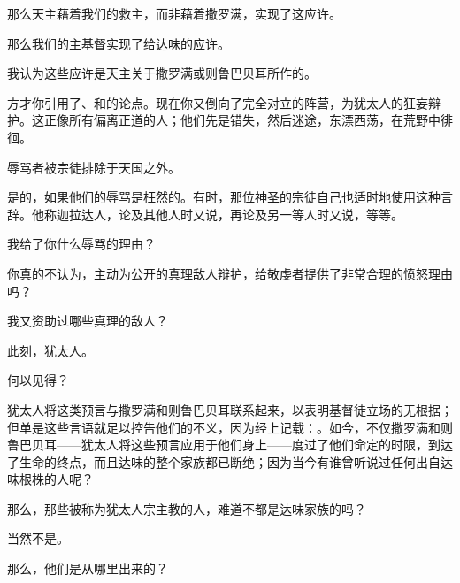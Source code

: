 那么天主藉着我们的救主，而非藉着撒罗满，实现了这应许。\par

那么我们的主基督实现了给达味的应许。\par

我认为这些应许是天主关于撒罗满或则鲁巴贝耳所作的。\par

方才你引用了、和的论点。现在你又倒向了完全对立的阵营，为犹太人的狂妄辩护。这正像所有偏离正道的人；他们先是错失，然后迷途，东漂西荡，在荒野中徘徊。\par

辱骂者被宗徒排除于天国之外。\par

是的，如果他们的辱骂是枉然的。有时，那位神圣的宗徒自己也适时地使用这种言辞。他称迦拉达人，论及其他人时又说，再论及另一等人时又说，等等。\par

我给了你什么辱骂的理由？\par

你真的不认为，主动为公开的真理敌人辩护，给敬虔者提供了非常合理的愤怒理由吗？\par

我又资助过哪些真理的敌人？\par

此刻，犹太人。\par

何以见得？\par

犹太人将这类预言与撒罗满和则鲁巴贝耳联系起来，以表明基督徒立场的无根据；但单是这些言语就足以控告他们的不义，因为经上记载：。如今，不仅撒罗满和则鲁巴贝耳——犹太人将这些预言应用于他们身上——度过了他们命定的时限，到达了生命的终点，而且达味的整个家族都已断绝；因为当今有谁曾听说过任何出自达味根株的人呢？\par

那么，那些被称为犹太人宗主教的人，难道不都是达味家族的吗？\par

当然不是。\par

那么，他们是从哪里出来的？\par

